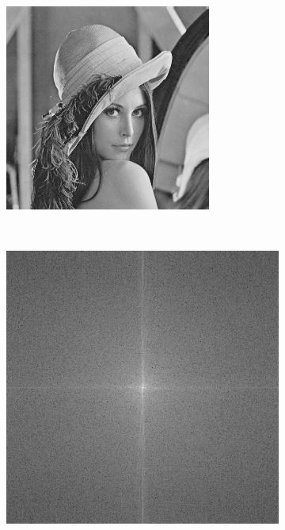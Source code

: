 \documentclass[
	article,			%
	11pt,				%
	oneside,			%
	a4paper,			%
	english,			%
	brazil,				%
	sumario=tradicional
	]{abntex2}
\begin{document}
\begin{figure}
		\centering
        \begin{subfigure}[b]{0.3\textwidth}
                \includegraphics[width=\textwidth,scale=1]{imagens/ex2/lena.png}
                \caption{}
                \label{fig:lenaOriginal}
        \end{subfigure}%
        ~ %
        \begin{subfigure}[b]{0.3\textwidth}
                \includegraphics[width=\textwidth,scale=1]{imagens/ex2/espectroOriginal.png}
                \caption{}
                \label{fig:especOriginal}
        \end{subfigure}
       

\end{figure}
\end{document}
